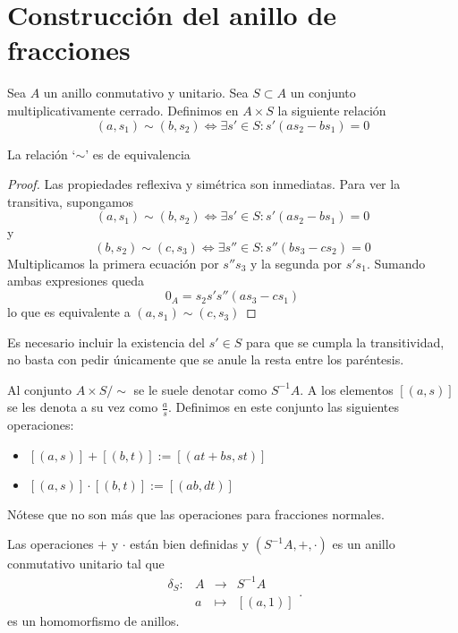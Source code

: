 \documentclass[../main.tex]{subfiles}
\begin{document}
	\section{Construcción del anillo de fracciones}
	Sea $A$ un anillo conmutativo y unitario. Sea $S\subset A$ un conjunto multiplicativamente cerrado. Definimos en $A\times S$ la siguiente relación$$(a,s_1)\sim (b,s_2)\iff \exists s'\in S : s'(as_2-bs_1)=0$$
	\begin{proposition}
		La relación `$\sim$' es de equivalencia
	\end{proposition}
	\begin{proof}
		Las propiedades reflexiva y simétrica son inmediatas. Para ver la transitiva, supongamos\begin{equation}
		(a,s_1)\sim (b,s_2)\iff \exists s'\in S : s'(as_2-bs_1)=0
		\end{equation} y \begin{equation}
		(b,s_2)\sim (c,s_3)\iff \exists s''\in S : s''(bs_3-cs_2)=0
		\end{equation}
		Multiplicamos la primera ecuación por $s''s_3$ y la segunda por $s's_1$. Sumando ambas expresiones queda $$0_A=s_2s's''(as_3-cs_1)$$ lo que es equivalente a $(a,s_1)\sim (c,s_3)$
	\end{proof}
	\begin{remark}
		Es necesario incluir la existencia del $s'\in S$ para que se cumpla la transitividad, no basta con pedir únicamente que se anule la resta entre los paréntesis.
	\end{remark}
	Al conjunto $A\times S/\sim$ se le suele denotar como $S^{-1}A$. A los elementos $[(a,s)]$ se les denota a su vez como $\frac{a}{s}$. Definimos en este conjunto las siguientes operaciones: \begin{itemize}
		\item $[(a,s)]+[(b,t)]:=[(at+bs,st)]$
		\item $[(a,s)]\cdot[(b,t)]:=[(ab,dt)]$
	\end{itemize}
	Nótese que no son más que las operaciones para fracciones normales.
	\begin{proposition}
		Las operaciones $+$ y $\cdot$ están bien definidas y $(S^{-1}A, +, \cdot)$ es un anillo conmutativo unitario tal que
		$$
		\begin{array}{rrcl}
		\delta_S:&A&\longrightarrow&S^{-1}A\\
		&a&\longmapsto&[(a,1)]
		\end{array}.$$ es un homomorfismo de anillos.
	\end{proposition}
\end{document}
